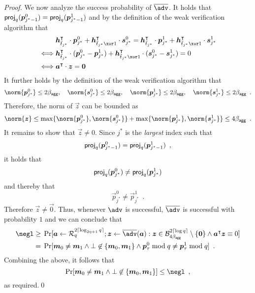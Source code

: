 \begin{proof}
  We now analyze the success probability of $\sisadv$.
  It holds that $\mathsf{proj}_{q}(\boldsymbol{p}_{j^*-1}^0) = \mathsf{proj}_{q}(\boldsymbol{p}_{j^*-1}^1)$ and by the definition of the weak verification algorithm that
  \begin{align*}
    &\vec{h}_{\tilde t_{j^*}}^\transpose\cdot\vec{p}_{j^*}^0 + \vec{h}_{\tilde t_{j^*}\xor 1}^\transpose\cdot\vec{s}_{j^*}^0 = \vec{h}_{\tilde t_{j^*}}^\transpose\cdot\vec{p}_{j^*}^1 + \vec{h}_{\tilde t_{j^*}\xor 1}^\transpose\cdot\vec{s}_{j^*}^1\\
    \iff&\vec{h}_{\tilde t_{j^*}}^\transpose\cdot(\vec{p}_{j^*}^0-\vec{p}_{j^*}^1) + \vec{h}_{\tilde t_{j^*}\xor 1}^\transpose\cdot(\vec{s}_{j^*}^0-\vec{s}_{j^*}^1) = 0\\
    \iff&\vec{a}^\transpose\cdot\vec{z} = \vec{0} 
  \end{align*}
  It further holds by the definition of the weak verification algorithm that 
  \[
  \norm{\vec{p}_{j^*}^0} \leq 2\bagg,\quad \norm{\vec{s}_{j^*}^0} \leq 2\bagg, \quad\norm{\vec{p}_{j^*}^1} \leq 2\bagg, \quad \norm{\vec{s}_{j^*}^1} \leq 2\bagg\enspace.
  \]
  Therefore, the norm of $\vec{z}$ can be bounded as
  \[
  \norm{\vec{z}} \leq \max\{\norm{\vec{p}_{j^*}^0},\norm{\vec{s}_{j^*}^0}\}+\max\{\norm{\vec{p}_{j^*}^1},\norm{\vec{s}_{j^*}^1}\} \leq 4\bagg\enspace.
  \]
  It remains to show that $\vec{z}\neq 0$.
  Since $j^*$ is the \emph{largest} index such that 
  \[
    \mathsf{proj}_{q}(\boldsymbol{p}_{j^*-1}^0) =  \mathsf{proj}_{q}(\boldsymbol{p}_{j^*-1}^1)\enspace,
  \]
  it holds that
  \[
    \mathsf{proj}_{q}(\boldsymbol{p}_{j^*}^0) \neq \mathsf{proj}_{q}(\boldsymbol{p}_{j^*}^1)
  \]
  and thereby that
  \[
    \vec{p}_{j^*}^0 \neq \vec{p}_{j^*}^1\enspace.
  \]
  Therefore $\vec{z}\neq\vec{0}$.
  Thus, whenever $\adv$ is successful, $\sisadv$ is successful with probability $1$ and we can conclude that
  \begin{align*}
  \negl \geq{}& \Pr[
      \vec{a} \gets \ring_q^{2\lceil\log_{2\eta+1} q\rceil}; \vec{z}\gets\sisadv(\vec{a}) : \vec{z}\in\ball_{4\bagg}^{2\lceil\log q\rceil}\setminus\{\vec{0}\} \land \vec{a}^\transpose\vec{z}\equiv 0
    ]\\
    ={}&
    \Pr[\vec{m}_0\neq \vec{m}_1 \land \bot\not\in\{\vec{m}_0,\vec{m}_1\} \land \vec{p}_\tau^0 \bmod q\neq \vec{p}_\tau^1\bmod q]\enspace.
  \end{align*}
  Combining the above, it follows that
  \[
    \Pr[\vec{m}_0\neq \vec{m}_1 \land \bot\not\in\{\vec{m}_0,\vec{m}_1\}] \leq \negl\enspace,
  \]
  as required.\qed
\end{proof}
